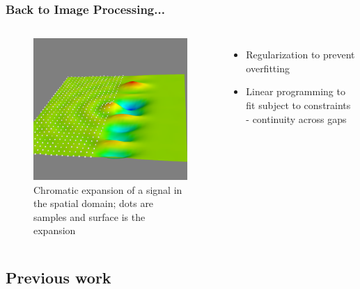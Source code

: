 \documentclass{beamer}
\begin{document}

\begin{frame}
\frametitle{Back to Image Processing...}

\begin{columns}[c]
\begin{figure} %
\centering
	\includegraphics[width=\columnwidth]{../figures/31x16bump.png}
\caption{Chromatic expansion of a signal in the spatial domain; 
dots are samples and surface is the expansion}
\end{figure}
\begin{itemize}
	\item Regularization to prevent overfitting
	\item Linear programming to fit subject to constraints - 
		continuity across gaps
\end{itemize}
\end{columns}

\end{frame}


\subsection{Previous work}
\end{document}
